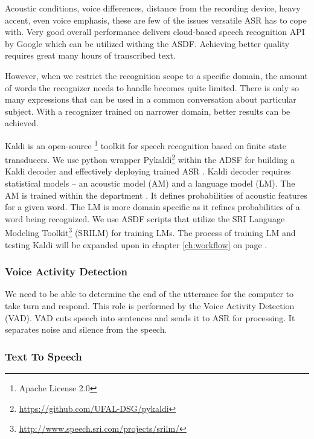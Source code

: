 Acoustic conditions, voice differences, distance from the recording device, heavy accent, even voice emphasis, these are few of the issues versatile ASR has to cope with.
Very good overall performance delivers cloud-based speech recognition API by Google which can be utilized withing the ASDF.
Achieving better quality requires great many hours of transcribed text.

However, when we restrict the recognition scope to a specific domain, the amount of words the recognizer needs to handle becomes quite limited.
There is only so many expressions that can be used in a common conversation about particular subject.
With a recognizer trained on narrower domain, better results can be achieved.


Kaldi is an open-source \footnote{Apache License 2.0} toolkit for speech recognition based on finite state transducers.
We use python wrapper Pykaldi\footnote{\url{https://github.com/UFAL-DSG/pykaldi}} within the ADSF for building a Kaldi decoder and effectively deploying trained ASR \cite{oplatek}.
Kaldi decoder requires statistical models -- an acoustic model (AM) and a language model (LM).
The AM is trained within the department \cite{oplatek_thesis}.
It defines probabilities of acoustic features for a given word.
The LM is more domain specific as it refines probabilities of a word being recognized.
We use ASDF scripts that utilize the SRI Language Modeling Toolkit\footnote{\url{http://www.speech.sri.com/projects/srilm/}} (SRILM) for training LMs.
The process of training LM and testing Kaldi will be expanded upon in chapter \ref{ch:workflow} on page \pageref{ch:workflow}.

\subsubsection{Voice Activity Detection}

We need to be able to determine the end of the utterance for the computer to take turn and respond.
This role is performed by the Voice Activity Detection (VAD).
VAD cuts speech into sentences and sends it to ASR for processing.
It separates noise and silence from the speech.

\subsubsection{Text To Speech}

